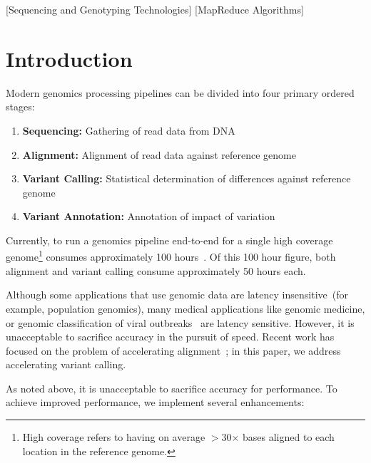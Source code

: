 \documentclass{acm_proc_article-sp}
\begin{document}
[Sequencing and Genotyping Technologies]
[MapReduce Algorithms]



\section{Introduction}
\label{sec:intro}

Modern genomics processing pipelines can be divided into four primary ordered stages:

\begin{enumerate}
\item \textbf{Sequencing:} Gathering of read data from DNA
\item \textbf{Alignment:} Alignment of read data against reference genome
\item \textbf{Variant Calling:} Statistical determination of differences against reference genome
\item \textbf{Variant Annotation:} Annotation of impact of variation
\end{enumerate}

Currently, to run a genomics pipeline end-to-end for a single high coverage genome\footnote{High coverage refers to having on average
$>$30$\times$ bases aligned to each location in the reference genome.} consumes approximately 100 hours~\cite{talwalkar13}. Of this
100 hour figure, both alignment and variant calling consume approximately 50 hours each.

Although some applications that use genomic data are latency insensitive~(for example, population genomics), many medical applications
like genomic medicine, or genomic classification of viral outbreaks~\cite{snitkin12} are latency sensitive. However, it is unacceptable to
sacrifice accuracy in the pursuit of speed. Recent work has focused on the problem of accelerating alignment~\cite{zaharia11}; in this paper,
we address accelerating variant calling.

As noted above, it is unacceptable to sacrifice accuracy for performance. To achieve improved performance, we implement several
enhancements:
\end{document}
